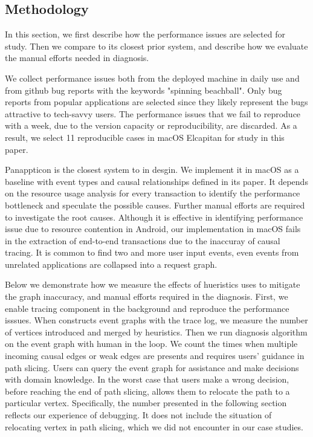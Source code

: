 \subsection{Methodology} \label{sec:methodology}

In this section, we first describe how the performance issues are selected for
study. Then we compare \xxx to its closest prior system, and describe how we
evaluate the manual efforts needed in diagnosis.

We collect performance issues both from the deployed machine in daily use and
from github bug reports with the keywords "spinning beachball". Only bug
reports from popular applications are selected since they likely represent the
bugs attractive to tech-savvy users. The performance issues that we fail to
reproduce with a week, due to the version capacity or reproducibility, are
discarded. As a result, we select 11 reproducible cases in macOS Elcapitan for
study in this paper.


Panappticon is the closest system to \xxx in desgin. We implement it in macOS
as a baseline with event types and causal relationships defined in its paper.
It depends on the resource usage analysis for every transaction to identify
the performance bottleneck and speculate the possible causes. Further manual
efforts are required to investigate the root causes. Although it is effective
in identifying performance issue due to resource contention in Android, our
implementation in macOS fails in the extraction of end-to-end transactions
due to the inaccuray of causal tracing.
It is common to find two and
more user input events, even events from unrelated applications are collapsed
into a request graph.

Below we demonstrate how we measure the effects of hueristics \xxx uses to
mitigate the graph inaccuracy, and manual efforts required in the diagnosis.
First, we enable tracing component in the background and reproduce the
performance isssues.  When \xxx constructs event graphs with the trace log, we
measure the number of vertices introduced and merged by heuristics.  Then we
run \xxx diagnosis algorithm on the event graph with human in the loop. We
count the times when multiple incoming causal edges or weak edges are presents
and \xxx requires users' guidance in path slicing. Users can query the event
graph for assistance and make decisions with domain knowledge. In the worst
case that users make a wrong decision, before reaching the end of path slicing,
\xxx allows them to relocate the path to a particular vertex. Specifically, the
number presented in the following section reflects our experience of debugging.
It does not include the situation of relocating vertex in path slicing, which
we did not encounter in our case studies.
